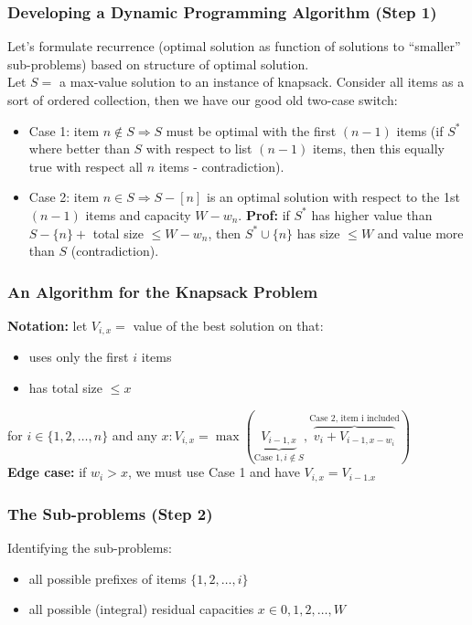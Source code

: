 \documentclass{scrartcl}
\begin{document}
\subsubsection{Developing a Dynamic Programming Algorithm (Step 1)}
\label{sec:9-1-1}
Let's formulate recurrence (optimal solution as function of solutions to
  ``smaller'' sub-problems) based on structure of optimal solution.\\
Let $S=$ a max-value solution to an instance of knapsack. Consider all items as
a sort of ordered collection, then we have our good old two-case switch:
\begin{itemize}
\item Case 1: item $n \notin S \Rightarrow S$ must be optimal with the first
  $(n-1)$ items (if $S^*$ where better than $S$ with respect to list $(n-1)$
  items, then this equally true with respect all $n$ items - contradiction).
\item Case 2: item $n \in S \Rightarrow S-[n]$ is an optimal solution with
  respect to the 1st $(n-1)$ items and capacity $W-w_n$. {\bf Prof: } if $S^*$
  has higher value than $S-\{n\} + $ total size $\leq W-w_n$, then $S^* \cup
  \{n\}$ has size $\leq W$ and value more than $S$ (contradiction).
\end{itemize}

\subsubsection{An Algorithm for the Knapsack Problem}
\label{sec:9-2}
{\bf Notation: } let $V_{i, x} = $ value of the best solution on that:
\begin{itemize}
\item uses only the first $i$ items
\item has total size $\leq x$
\end{itemize}
for $i \in \{1, 2, \dots, n\}$ and any $x: V_{i,x} = \max(\underbrace{V_{i-1,
    x}}_{\mbox{Case 1}, i \notin S}, \overbrace{v_i + V_{i-1,x -
    w_i}}^{\mbox{Case 2, item i included} }) $\\
{\bf Edge case: } if $w_i > x$, we must use Case 1 and have $V_{i, x} = V_{i-1. x}$

\subsubsection{The Sub-problems (Step 2)}
\label{sec:9-2-2}
Identifying the sub-problems: 
\begin{itemize}
\item all possible prefixes of items $\{1, 2, \dots, i\}$
\item all possible (integral) residual capacities $x \in {0, 1, 2, \dots, W}$
\end{itemize}
\end{document}
